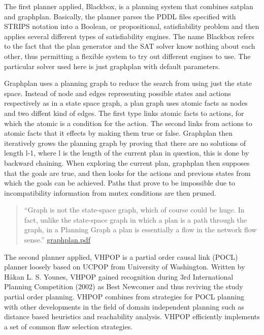 \documentclass{article}
\begin{document}
    The first planner applied, Blackbox, is a planning system that combines
satplan and graphplan. Basically, the planner parses the PDDL files
specified with STRIPS notation into a Boolean, or propositional,
satisfiability problem and then applies several different types of
satisfiability engines. The name Blackbox refers to the fact that the
plan generator and the SAT solver know nothing about each other, thus
permitting a flexible system to try out different engines to use. The
particular solver used here is just graphplan with default parameters.

Graphplan uses a planning graph to reduce the search from using just the
state space. Instead of node and edges representing possible states and
actions respectively as in a state space graph, a plan graph uses atomic
facts as nodes and two diffent kind of edges. The first type links
atomic facts to actions, for which the atomic is a condition for the
action. The second links from actions to atomic facts that it effects by
making them true or false. Graphplan then iteratively grows the planning
graph by proving that there are no solutions of length l-1, where l is
the length of the current plan in question, this is done by backward
chaining. When exploring the current plan, graphplan then supposes that
the goals are true, and then looks for the actions and previous states
from which the goals can be achieved. Paths that prove to be impossible
due to incompatibility information from mutex conditions are then
pruned.

\begin{quote}
``Graph is not the state-space graph, which of course could be huge. In
fact, unlike the state-space graph in which a plan is a path through the
graph, in a Planning Graph a plan is essentially a flow in the network
flow sense.''
\href{http://www.cs.cmu.edu/~avrim/Papers/graphplan.pdf}{graphplan.pdf}
\end{quote}

The second planner applied, VHPOP is a partial order causal link (POCL)
planner loosely based on UCPOP from University of Washington. Written by
Håkan L. S. Younes, VHPOP gained recognition during 3rd International
Planning Competition (2002) as Best Newcomer and thus reviving the study
partial order planning. VHPOP combines from strategies for POCL planning
with other developments in the field of domain independent planning such
as distance based heuristics and reachability analysis. VHPOP
efficiently implements a set of common flaw selection strategies.
\end{document}
